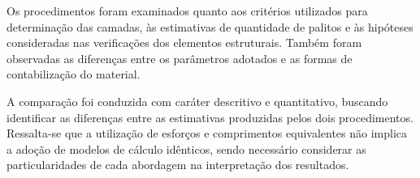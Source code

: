 Os procedimentos foram examinados quanto aos critérios utilizados para determinação das camadas, às estimativas de quantidade de palitos e às hipóteses consideradas nas verificações dos elementos estruturais. Também foram observadas as diferenças entre os parâmetros adotados e as formas de contabilização do material.

A comparação foi conduzida com caráter descritivo e quantitativo, buscando identificar as diferenças entre as estimativas produzidas pelos dois procedimentos. Ressalta-se que a utilização de esforços e comprimentos equivalentes não implica a adoção de modelos de cálculo idênticos, sendo necessário considerar as particularidades de cada abordagem na interpretação dos resultados.
